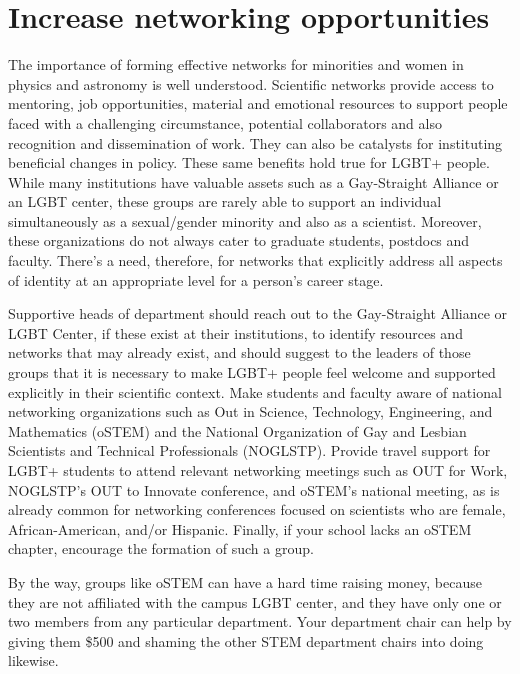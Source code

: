 \section {Increase networking opportunities}
\label{networking}
The importance of forming effective networks for minorities and women in physics and astronomy is well understood. Scientific networks provide access to mentoring, job opportunities, material and emotional resources to support people faced with a challenging circumstance, potential collaborators and also recognition and dissemination of work. They can also be catalysts for instituting beneficial changes in policy. These same benefits hold true for LGBT+ people. While many institutions have valuable assets such as a Gay-Straight Alliance or an LGBT center, these groups are rarely able to support an individual simultaneously as a sexual/gender minority and also as a scientist. Moreover, these organizations do not always cater to graduate students, postdocs and faculty. There's a need, therefore, for networks that explicitly address all aspects of identity at an appropriate level for a person's career stage.

Supportive heads of department should reach out to the Gay-Straight Alliance or LGBT Center, if these exist at their institutions, to identify resources and networks that may already exist, and should suggest to the leaders of those groups that it is necessary to make LGBT+ people feel welcome and supported explicitly in their scientific context. Make students and faculty aware of national networking organizations such as Out in Science, Technology, Engineering, and Mathematics (oSTEM) and the National Organization of Gay and Lesbian Scientists and Technical Professionals (NOGLSTP). Provide travel support for LGBT+ students to attend relevant networking meetings such as OUT for Work, NOGLSTP's OUT to Innovate conference, and oSTEM's national meeting, as is already common for networking conferences focused on scientists who are female, African-American, and/or Hispanic. Finally, if your school lacks an oSTEM chapter, encourage the formation of such a group.

By the way, groups like oSTEM  can have a hard time raising money, because they are not
affiliated with the campus LGBT center, and they have only one or two members from any particular department.  Your department chair can help by giving them \$500 and shaming the other STEM department chairs into doing likewise.


